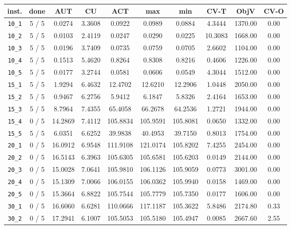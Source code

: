 \begin{table}[h!]
\begin{center}
\small
\begin{tabular}{| c | c | c | c | c | c | c | c | c | c |}
\hline
inst. & done & AUT & CU & ACT & max & min & CV-T & ObjV & CV-O \\
\hline
\verb|10_1| & 5 / 5 & 0.0274 & 3.3608 & 0.0922 & 0.0989 & 0.0884 & 4.3444 & 1370.00 & 0.00\\ 
\verb|10_2| & 5 / 5 & 0.0103 & 2.4119 & 0.0247 & 0.0290 & 0.0225 & 10.3083 & 1668.00 & 0.00\\ 
\verb|10_3| & 5 / 5 & 0.0196 & 3.7409 & 0.0735 & 0.0759 & 0.0705 & 2.6602 & 1104.00 & 0.00\\ 
\verb|10_4| & 5 / 5 & 0.1513 & 5.4620 & 0.8264 & 0.8308 & 0.8216 & 0.4606 & 1226.00 & 0.00\\ 
\verb|10_5| & 5 / 5 & 0.0177 & 3.2744 & 0.0581 & 0.0606 & 0.0549 & 4.3044 & 1512.00 & 0.00\\ 
\verb|15_1| & 5 / 5 & 1.9294 & 6.4632 & 12.4702 & 12.6210 & 12.2906 & 1.0448 & 2050.00 & 0.00\\ 
\verb|15_2| & 5 / 5 & 0.9467 & 6.2756 & 5.9412 & 6.1847 & 5.8326 & 2.4164 & 1653.00 & 0.00\\ 
\verb|15_3| & 5 / 5 & 8.7964 & 7.4355 & 65.4058 & 66.2678 & 64.2536 & 1.2721 & 1944.00 & 0.00\\ 
\verb|15_4| & 0 / 5 & 14.2869 & 7.4112 & 105.8834 & 105.9591 & 105.8081 & 0.0650 & 1332.00 & 0.00\\ 
\verb|15_5| & 5 / 5 & 6.0351 & 6.6252 & 39.9838 & 40.4953 & 39.7150 & 0.8013 & 1754.00 & 0.00\\ 
\verb|20_1| & 0 / 5 & 16.0912 & 6.9548 & 111.9108 & 121.0174 & 105.8202 & 7.4255 & 2454.00 & 0.00\\ 
\verb|20_2| & 0 / 5 & 16.5143 & 6.3963 & 105.6305 & 105.6581 & 105.6203 & 0.0149 & 2144.00 & 0.00\\ 
\verb|20_3| & 0 / 5 & 15.0028 & 7.0641 & 105.9810 & 106.1126 & 105.9059 & 0.0773 & 3001.00 & 0.00\\ 
\verb|20_4| & 0 / 5 & 15.1309 & 7.0066 & 106.0155 & 106.0362 & 105.9940 & 0.0158 & 1469.00 & 0.00\\ 
\verb|20_5| & 0 / 5 & 15.3664 & 6.8822 & 105.7544 & 105.7779 & 105.7350 & 0.0177 & 1606.00 & 0.00\\ 
\verb|30_1| & 0 / 5 & 16.6060 & 6.6281 & 110.0666 & 117.1187 & 105.3622 & 5.8486 & 2174.80 & 0.33\\ 
\verb|30_2| & 0 / 5 & 17.2941 & 6.1007 & 105.5053 & 105.5180 & 105.4947 & 0.0085 & 2667.60 & 2.55\\ 

\end{tabular}
\end{center}
\end{table}
